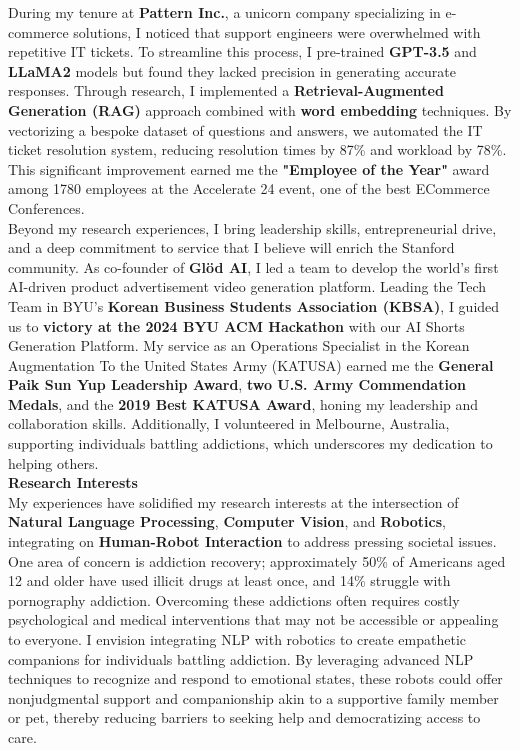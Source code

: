 \documentclass{article}
\begin{document}
During my tenure at \textbf{Pattern Inc.}, a unicorn company specializing in e-commerce solutions, I noticed that support engineers were overwhelmed with repetitive IT tickets. To streamline this process, I pre-trained \textbf{GPT-3.5} and \textbf{LLaMA2} models but found they lacked precision in generating accurate responses. Through research, I implemented a \textbf{Retrieval-Augmented Generation (RAG)} approach combined with \textbf{word embedding} techniques. By vectorizing a bespoke dataset of questions and answers, we automated the IT ticket resolution system, reducing resolution times by 87\% and workload by 78\%. This significant improvement earned me the \textbf{"Employee of the Year"} award among 1780 employees at the Accelerate 24 event, one of the best ECommerce Conferences.
\\

Beyond my research experiences, I bring leadership skills, entrepreneurial drive, and a deep commitment to service that I believe will enrich the Stanford community. As co-founder of \textbf{Glöd AI}, I led a team to develop the world's first AI-driven product advertisement video generation platform. Leading the Tech Team in BYU's \textbf{Korean Business Students Association (KBSA)}, I guided us to \textbf{victory at the 2024 BYU ACM Hackathon} with our AI Shorts Generation Platform. My service as an Operations Specialist in the Korean Augmentation To the United States Army (KATUSA) earned me the \textbf{General Paik Sun Yup Leadership Award}, \textbf{two U.S. Army Commendation Medals}, and the \textbf{2019 Best KATUSA Award}, honing my leadership and collaboration skills. Additionally, I volunteered in Melbourne, Australia, supporting individuals battling addictions, which underscores my dedication to helping others.
\\

\textbf{Research Interests}\\
My experiences have solidified my research interests at the intersection of \textbf{Natural Language Processing}, \textbf{Computer Vision}, and \textbf{Robotics}, integrating on \textbf{Human-Robot Interaction} to address pressing societal issues. 
\\

One area of concern is addiction recovery; approximately 50\% of Americans aged 12 and older have used illicit drugs at least once, and 14\% struggle with pornography addiction. Overcoming these addictions often requires costly psychological and medical interventions that may not be accessible or appealing to everyone. I envision integrating NLP with robotics to create empathetic companions for individuals battling addiction. By leveraging advanced NLP techniques to recognize and respond to emotional states, these robots could offer nonjudgmental support and companionship akin to a supportive family member or pet, thereby reducing barriers to seeking help and democratizing access to care.
\\
\end{document}
